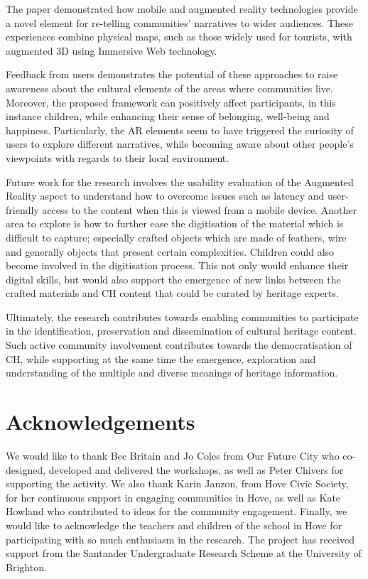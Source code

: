 \documentclass[acmlarge,screen,dvipsnames]{acmart}
\begin{document}
The paper demonstrated how mobile and augmented reality technologies provide a
novel element for re-telling communities' narratives to wider audiences. These
experiences combine physical maps, such as those widely used for tourists,
with augmented 3D using Immersive Web technology. 

Feedback from users demonstrates the potential of these approaches to raise
awareness about the cultural elements of the areas where communities live. Moreover, the proposed framework can positively affect participants, in this instance children, while enhancing their sense of belonging, well-being and happiness. Particularly, the AR elements seem to have triggered the curiosity of users to explore different narratives, while becoming aware about other people's viewpoints with regards to their local environment.

Future work for the research involves the usability evaluation of the Augmented Reality aspect
to understand how to overcome issues such as latency and
user-friendly access to the content when this is viewed from a mobile device.
Another area to explore is how to further ease the digitisation of the material which is difficult to capture; especially crafted objects which are made of feathers, wire and generally objects that present certain complexities. Children could also
become involved in the digitisation process. This not only would enhance their digital
skills, but would also support the emergence of new links between the crafted materials and
CH content that could be curated by heritage experts. 

   

Ultimately, the research contributes towards enabling communities to
participate in the identification, preservation and dissemination of cultural heritage content. Such active community involvement contributes towards the democratisation of CH, while supporting at the same time the emergence, exploration and understanding of the multiple and diverse meanings of heritage information.
\color{black}


\section{Acknowledgements} We would like to thank Bec Britain and Jo Coles
from Our Future City who co-designed, developed and delivered the workshops, as
well as Peter Chivers for supporting the activity. We also thank Karin Janzon,
from Hove Civic Society, for her continuous support in engaging communities in
Hove, as well as Kate Howland who contributed to ideas for the community engagement. 
Finally, we would like to acknowledge the teachers and children of the
school in Hove for participating with so much enthusiasm in the research. 
The project has received support from the Santander Undergraduate Research Scheme
at the University of Brighton.




%

 
\end{document}
